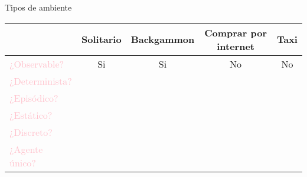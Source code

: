  

    \begin{frame}{Tipos de ambiente}
        \begin{center}
        \begin{tabular}{|l|c|c|c|c|} \hline
                \multicolumn{1}{|p{2cm}|}{\centering }
              & \multicolumn{1}{p{1.3cm}|}{\centering Solitario}
              & \multicolumn{1}{p{2.1cm}|}{\centering Backgammon}
              & \multicolumn{1}{p{3.4cm}|}{\centering Comprar por internet}
              & \multicolumn{1}{p{0.7cm}|}{\centering Taxi}
                \tabularnewline \hline
                \textcolor{Pink}{¿Observable?} & Si & Si & No & No \\
                \textcolor{Pink}{¿Determinista?} &  &  &  & \\
                \textcolor{Pink}{¿Episódico?} &  &  &  &  \\
                \textcolor{Pink}{¿Estático?} &  &  &  &  \\
                \textcolor{Pink}{¿Discreto?} &  &  & &  \\
                \textcolor{Pink}{¿Agente único?} &  &  &  &  \\ \hline
        \end{tabular}
        \end{center}
    \end{frame}
